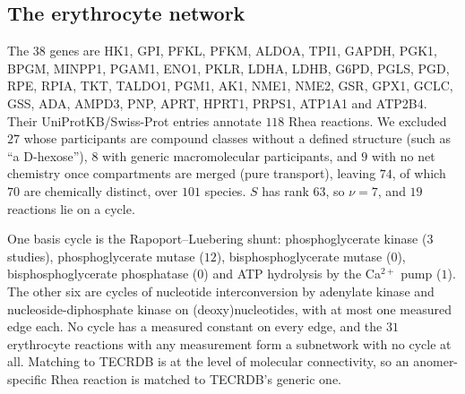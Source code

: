 \documentclass[11pt,a4paper]{article}
\theoremstyle{definition}
\theoremstyle{remark}
\begin{document}
\subsection*{The erythrocyte network}

The $38$ genes are HK1, GPI, PFKL, PFKM, ALDOA, TPI1, GAPDH, PGK1, BPGM,
MINPP1, PGAM1, ENO1, PKLR, LDHA, LDHB, G6PD, PGLS, PGD, RPE, RPIA, TKT,
TALDO1, PGM1, AK1, NME1, NME2, GSR, GPX1, GCLC, GSS, ADA, AMPD3, PNP,
APRT, HPRT1, PRPS1, ATP1A1 and ATP2B4. Their UniProtKB/Swiss-Prot
entries annotate $118$ Rhea reactions. We excluded $27$ whose
participants are compound classes without a defined structure (such as
``a D-hexose''), $8$ with generic macromolecular participants, and $9$
with no net chemistry once compartments are merged (pure transport),
leaving $74$, of which $70$ are chemically distinct, over $101$ species.
$S$ has rank $63$, so $\nu=7$, and $19$ reactions lie on a cycle.

One basis cycle is the Rapoport--Luebering shunt: phosphoglycerate
kinase ($3$ studies), phosphoglycerate mutase ($12$),
bisphosphoglycerate mutase ($0$), bisphosphoglycerate phosphatase ($0$)
and ATP hydrolysis by the Ca$^{2+}$ pump ($1$). The other six are cycles
of nucleotide interconversion by adenylate kinase and
nucleoside-diphosphate kinase on (deoxy)nucleotides, with at most one
measured edge each. No cycle has a measured constant on every edge, and
the $31$ erythrocyte reactions with any measurement form a subnetwork
with no cycle at all. Matching to TECRDB is at the level of molecular
connectivity, so an anomer-specific Rhea reaction is matched to
TECRDB's generic one.




\end{document}
